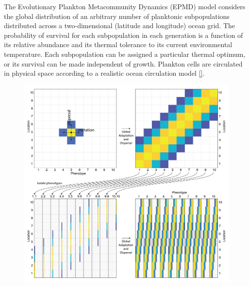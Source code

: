 \documentclass[12pt]{article}
\begin{document}
The Evolutionary Plankton Metacommunity Dynamics (EPMD) model considers the global distribution of an arbitrary number of  planktonic subpopulations distributed across a two-dimensional (latitude and longitude) ocean grid. The probability of survival for each subpopulation in each generation is a function of its relative abundance and its thermal tolerance to its current environmental temperature. Each subpopulation can be assigned a particular thermal optimum, or its survival can be made independent of growth. Plankton cells are circulated in physical space according to a realistic ocean circulation model \ref{}. 


\begin{figure}[htp!]
\centering
\includegraphics[width=0.8\linewidth]{../Figures/Schematic.png}
\caption{}
\label{Schematic}
\end{figure}


\begin{figure}[htp!]
\begin{subfigure}{0.5\textwidth}
\end{subfigure}
\begin{subfigure}{0.5\textwidth}
\end{subfigure}
\caption{}
\label{Schematic}
\end{figure}
\end{document}
